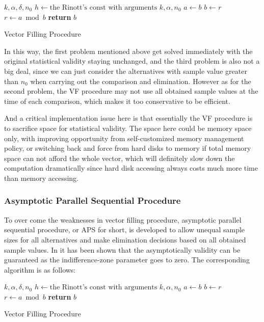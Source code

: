 \begin{algorithm}
 \begin{algorithmic}[1]
 \Require $k, \alpha, \delta, n_0$
 \State $h \gets \text{the Rinott's const with arguments } k, \alpha, n_0$
 \State 
 \State $a\gets b$
 \State $b\gets r$
 \State $r\gets a\bmod b$
 \EndWhile
 \State \textbf{return} $b$ 
 \end{algorithmic}
 \caption{Vector Filling Procedure}
 \label{vf_alg}
\end{algorithm}

In this way, the first problem mentioned above get solved immediately with the original statistical validity staying unchanged, and the third problem is also not a big deal, since we can just consider the alternatives with sample value greater than $n_0$ when carrying out the comparison and elimination. However as for the second problem, the VF procedure may not use all obtained sample values at the time of each comparison, which makes it too conservative to be efficient.

And a critical implementation issue here is that essentially the VF procedure is to sacrifice space for statistical validity. The space here could be memory space only, with improving opportunity from self-customized memory management policy, or switching back and force from hard disks to memory if total memory space can not afford the whole vector, which will definitely slow down the computation dramatically since hard disk accessing always costs much more time than memory accessing.

\subsubsection{Asymptotic Parallel Sequential Procedure}

To over come the weaknesses in vector filling procedure, asymptotic parallel sequential procedure, or APS for short, is developed to allow unequal sample sizes for all alternatives and make elimination decisions based on all obtained sample values. In \cite{ras-seq-parallel} it has been shown that the asymptotically validity can be guaranteed as the indifference-zone parameter goes to zero. The corresponding algorithm is as follows:

\begin{algorithm}
 \begin{algorithmic}[1]
 \Require $k, \alpha, \delta, n_0$
 \State $h \gets \text{the Rinott's const with arguments } k, \alpha, n_0$
 \State 
 \State $a\gets b$
 \State $b\gets r$
 \State $r\gets a\bmod b$
 \EndWhile
 \State \textbf{return} $b$ 
 \end{algorithmic}
 \caption{Vector Filling Procedure}
 \label{aps_alg}
\end{algorithm}


